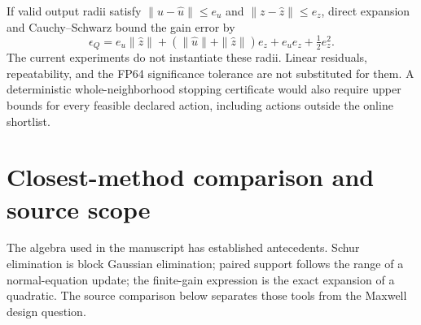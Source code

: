 \documentclass[11pt]{article}
\begin{document}
If valid output radii satisfy $\|u-\widehat u\|\le e_u$ and $\|z-\widehat z\|\le e_z$, direct expansion and Cauchy--Schwarz bound the gain error by
\[
\epsilon_Q=e_u\|\widehat z\|+(\|\widehat u\|+\|\widehat z\|)e_z
+e_ue_z+\tfrac12e_z^2.
\]
The current experiments do not instantiate these radii. Linear residuals, repeatability, and the FP64 significance tolerance are not substituted for them. A deterministic whole-neighborhood stopping certificate would also require upper bounds for every feasible declared action, including actions outside the online shortlist.

\section{Closest-method comparison and source scope}
The algebra used in the manuscript has established antecedents. Schur elimination is block Gaussian elimination; paired support follows the range of a normal-equation update; the finite-gain expression is the exact expansion of a quadratic. The source comparison below separates those tools from the Maxwell design question.
\end{document}
